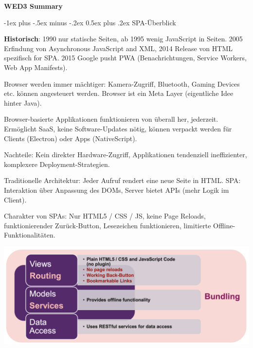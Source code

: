 \documentclass[10pt,landscape]{article}
\makeatletter
\renewcommand{\section}{\@startsection{section}{1}{0mm}%
{-1ex plus -.5ex minus -.2ex}%
{0.5ex plus .2ex}%
{\normalfont\large\bfseries}}
\makeatother
\begin{document}
    \raggedright
    \footnotesize
    \begin{multicols}{3}


        \setlength{\premulticols}{1pt}
        \setlength{\postmulticols}{1pt}
        \setlength{\multicolsep}{1pt}
        \setlength{\columnsep}{2pt}

        \begin{center}
            \Large{\textbf{WED3 Summary}} \\
        \end{center}


        \section{SPA-Überblick}

        \textbf{Historisch}: 1990 nur statische Seiten, ab 1995 wenig JavaScript in Seiten.
        2005 Erfindung von Asynchronous JavaScript and XML, 2014 Release von HTML spezifisch for SPA.
        2015 Google pusht PWA (Benachrichtungen, Service Workers, Web App Manifests).

        Browser werden immer mächtiger: Kamera-Zugriff, Bluetooth, Gaming Devices etc. können angesteuert werden.
        Browser ist ein Meta Layer (eigentliche Idee hinter Java).

        Browser-basierte Applikationen funktionieren von überall her, jederzeit.
        Ermöglicht SaaS, keine Software-Updates nötig, können verpackt werden für Clients (Electron) oder Apps (NativeScript).

        Nachteile: Kein direkter Hardware-Zugriff, Applikationen tendenziell ineffizienter, komplexere Deployment-Strategien.

        Traditionelle Architektur: Jeder Aufruf rendert eine neue Seite in HTML.
        SPA: Interaktion über Anpassung des DOMs, Server bietet APIs (mehr Logik im Client).

        Charakter von SPAs: Nur HTML5 / CSS / JS, keine Page Reloads, funktionierender Zurück-Button, Lesezeichen funktionieren, limitierte Offline-Funktionalitäten.

        \includegraphics[width=\linewidth]{spa_logical_overview}


\end{multicols}
\end{document}

